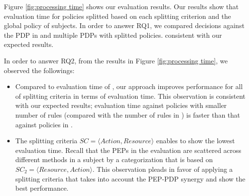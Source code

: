 Figure \ref{fig:processing time} shows our evaluation results. Our results show that evaluation time for policies splitted based on each splitting criterion and the global policy of subjects.
In order to answer RQ1, we compared decisions against the PDP in  and multiple PDPs with splitted policies.
consistent with our expected results.

In order to answer RQ2, from the results in Figure \ref{fig:processing time}, 
we observed the followings:

\begin{itemize} 

\item Compared to evaluation time of , our approach improves performance for all of splitting criteria
in terms of evaluation time. This observation is consistent with our expected results; evaluation time against
policies with smaller number of rules (compared with the number of rules in ) is faster than that against
policies in .


\item The splitting criteria \normalsize $SC=\langle Action, Resource\rangle$ enables to show the lowest evaluation time. 
Recall that the PEPs in the evaluation are scattered across different methods in a subject by a categorization 
that is based on $SC_{2}=\langle Resource,Action\rangle$. This observation pleads in favor of applying a splitting criteria 
that takes into account the PEP-PDP synergy and show the best performance.



\end{itemize} 

